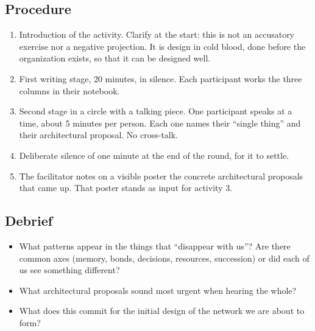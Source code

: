 \documentclass[11pt, a4paper]{article}
\begin{document}
\begin{actividad}
\subsection*{Procedure}
\begin{enumerate}[label={\arabic*.}]
  \item Introduction of the activity. Clarify at the start: this is not an accusatory exercise nor a negative projection. It is design in cold blood, done before the organization exists, so that it can be designed well.
  \item First writing stage, 20 minutes, in silence. Each participant works the three columns in their notebook.
  \item Second stage in a circle with a talking piece. One participant speaks at a time, about 5 minutes per person. Each one names their ``single thing'' and their architectural proposal. No cross-talk.
  \item Deliberate silence of one minute at the end of the round, for it to settle.
  \item The facilitator notes on a visible poster the concrete architectural proposals that came up. That poster stands as input for activity 3.
\end{enumerate}

\subsection*{Debrief}
\begin{itemize}
  \item What patterns appear in the things that ``disappear with us''? Are there common axes (memory, bonds, decisions, resources, succession) or did each of us see something different?
  \item What architectural proposals sound most urgent when hearing the whole?
  \item What does this commit for the initial design of the network we are about to form?
\end{itemize}


\end{actividad}
\end{document}
